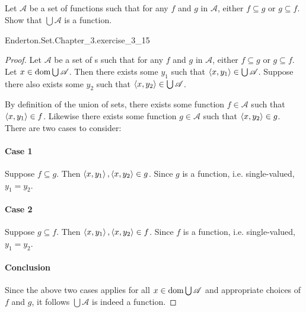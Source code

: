 \documentclass{report}
\begin{document}
\subsection{}%

  Let $\mathscr{A}$ be a set of functions such that for any $f$ and $g$ in
    $\mathscr{A}$, either $f \subseteq g$ or $g \subseteq f$.
  Show that $\bigcup{\mathscr{A}}$ is a function.

    {Enderton.Set.Chapter\_3.exercise\_3\_15}

  \begin{proof}
    Let $\mathscr{A}$ be a set of s such that for any $f$
      and $g$ in $\mathscr{A}$, either $f \subseteq g$ or $g \subseteq f$.
    Let $x \in \mathop{\text{dom}}{\bigcup{\mathscr{A}}}$.
    Then there exists some $y_1$ such that
      $\left< x, y_1 \right> \in \bigcup{\mathscr{A}}$.
    Suppose there also exists some $y_2$ such that
      $\left< x, y_2 \right> \in \bigcup{\mathscr{A}}$.

    By definition of the union of sets, there exists some function
      $f \in \mathscr{A}$ such that $\left< x, y_1 \right> \in f$.
    Likewise there exists some function $g \in \mathscr{A}$ such that
      $\left< x, y_2 \right> \in g$.
    There are two cases to consider:

    \paragraph{Case 1}%

      Suppose $f \subseteq g$.
      Then $\left< x, y_1 \right>, \left< x, y_2 \right> \in g$.
      Since $g$ is a function, i.e. single-valued, $y_1 = y_2$.

    \paragraph{Case 2}%

      Suppose $g \subseteq f$.
      Then $\left< x, y_1 \right>, \left< x, y_2 \right> \in f$.
      Since $f$ is a function, i.e. single-valued, $y_1 = y_2$.

    \paragraph{Conclusion}%

      Since the above two cases applies for all
        $x \in \mathop{\text{dom}}{\bigcup{\mathscr{A}}}$ and appropriate choices of $f$ and $g$,
        it follows $\bigcup{\mathscr{A}}$ is indeed a function.

  \end{proof}
\end{document}
